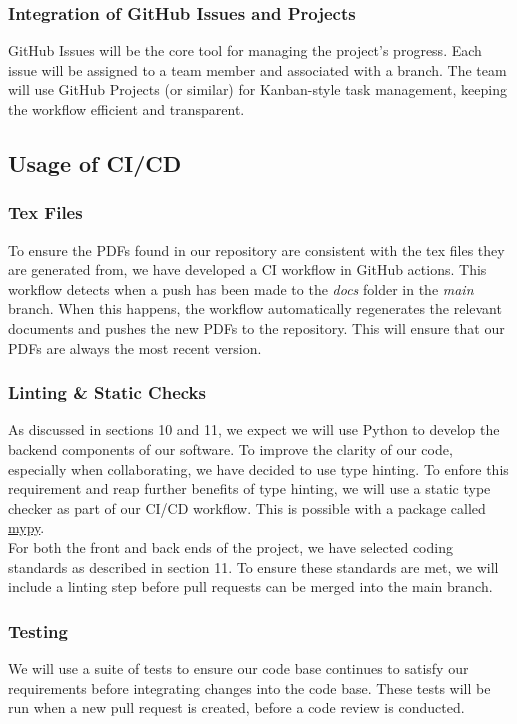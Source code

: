 \documentclass{article}
\begin{document}
\subsubsection{Integration of GitHub Issues and Projects} 
GitHub Issues will be the core tool for managing the project’s progress. Each issue will be assigned to a team member and associated with a branch. The team will use GitHub Projects (or similar) for Kanban-style task management, keeping the workflow efficient and transparent.

\subsection{Usage of CI/CD}

\subsubsection{Tex Files}
To ensure the PDFs found in our repository are consistent with the tex files they are generated from, we have developed a CI workflow in GitHub actions.
 This workflow detects when a push has been made to the \textit{docs} folder in the \textit{main} branch. When this happens, the workflow automatically regenerates
 the relevant documents and pushes the new PDFs to the repository. This will ensure that our PDFs are always the most recent version.

\subsubsection{Linting \& Static Checks}
As discussed in sections 10 and 11, we expect we will use Python to develop the backend components of our software. To improve the clarity of our code, especially
when collaborating, we have decided to use type hinting. To enfore this requirement and reap further benefits of type hinting, we will use a static
type checker as part of our CI/CD workflow. This is possible with a package called 
 \href{https://mypy-lang.org/}{mypy}.\\

 For both the front and back ends of the project, we have selected coding standards as described in section 11. To ensure these standards are met, we will include
 a linting step before pull requests can be merged into the main branch.

\subsubsection{Testing}
We will use a suite of tests to ensure our code base continues to satisfy our requirements before integrating changes into the code base. These tests
will be run when a new pull request is created, before a code review is conducted.
\end{document}
